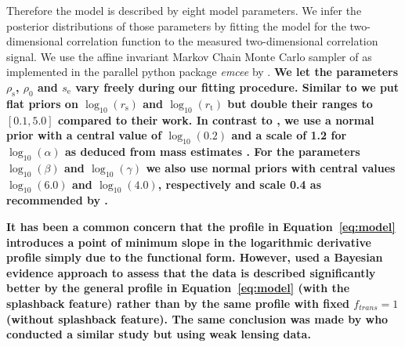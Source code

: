 \documentclass[iop, apjl, twocolappendix, numberedappendix]{emulateapj}
\begin{document}
Therefore the model is described by eight model parameters.
We infer the posterior distributions of those parameters by fitting the model for the two-dimensional correlation
function to the measured two-dimensional correlation signal.
We use the affine invariant Markov Chain Monte Carlo sampler of \citet{goodman2010ensemble} as
implemented in the parallel python package {\it emcee} by
\citet{foreman2013emcee}.
\textbf{We let the parameters $\rho_{\mathrm{s}}$, $\rho_0$ and
$s_{\mathrm{e}}$ vary freely during our fitting procedure. Similar to
\citet{more2016detection} we put flat priors on $\log_{10}(r_{\mathrm{s}})$ and
$\log_{10}(r_{\mathrm{t}})$ but double their ranges to $[0.1,5.0]$ compared to
their work. In contrast to \citet{more2016detection}, we use a normal prior
with a central value of $\log_{10}(0.2)$ and a scale of 1.2 for
$\log_{10}(\alpha)$ as deduced from mass estimates \citep{gao2008redshift}.
For the parameters $\log_{10}(\beta)$ and $\log_{10}(\gamma)$ we also use
normal priors with central values $\log_{10}(6.0)$ and $\log_{10}(4.0)$,
respectively and scale 0.4 as recommended by \citet{diemer2014dependence}.}

\textbf{It has been a common concern that the profile in
Equation~\ref{eq:model} introduces a point of minimum slope in the logarithmic
derivative profile simply due to the functional form. However,
\citet{baxter2017halo} used a Bayesian evidence approach to assess that the
data is described significantly better by the general profile in
Equation~\ref{eq:model} (with the splashback feature) rather than by the same
profile with fixed $f_{trans} = 1$ (without splashback feature).  The same
conclusion was made by \citet{umetsu2017lensing} who conducted a similar study
but using weak lensing data.}
\end{document}
